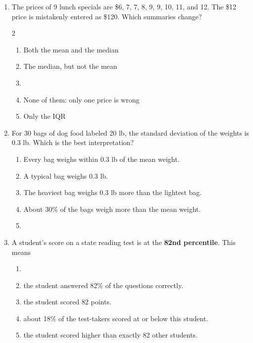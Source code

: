 \documentclass[12pt]{article}
\newenvironment{choices}
  {\begin{enumerate}[label=\textbf{(\Alph*)}, leftmargin=2.2em, itemsep=0pt, topsep=1pt]}
  {\end{enumerate}}
\newcommand{\letterroom}{\rule[-15pt]{0pt}{36pt}}
\begin{document}
\begin{enumerate}[leftmargin=1.9em, itemsep=0.03in]
  \boxguard[10]
  \item The prices of 9 lunch specials are \$6, 7, 7, 8, 9, 9, 10, 11, and 12. The \$12 price is
        mistakenly entered as \$120. Which summaries change?
        \begin{multicols}{2}
        \begin{choices}
          \item Both the mean and the median
          \item The median, but not the mean
          \item {}
          \item None of them: only one price is wrong
          \item Only the IQR
                \hfill{}\letterroom
        \end{choices}
        \end{multicols}

  \boxguard[10]
  \item For 30 bags of dog food labeled 20 lb, the standard deviation of the weights is 0.3 lb.
        Which is the best interpretation?
        \begin{choices}
          \item Every bag weighs within 0.3 lb of the mean weight.
          \item A typical bag weighs 0.3 lb.
          \item The heaviest bag weighs 0.3 lb more than the lightest bag.
          \item About 30\% of the bags weigh more than the mean weight.
          \item {}
                \hfill{}\letterroom
        \end{choices}

  \boxguard[10]
  \item A student's score on a state reading test is at the \textbf{82nd percentile}. This means
        \begin{choices}
          \item {}
          \item the student answered 82\% of the questions correctly.
          \item the student scored 82 points.
          \item about 18\% of the test-takers scored at or below this student.
          \item the student scored higher than exactly 82 other students.
                \hfill{}\letterroom
        \end{choices}


\end{enumerate}
\end{document}
